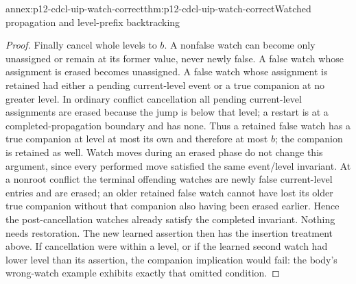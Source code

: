\begin{annexitem}{annex:p12-cdcl-uip-watch-correct}{thm:p12-cdcl-uip-watch-correct}{Watched propagation and level-prefix backtracking}
\begin{proof}
Finally cancel whole levels to \(b\).  A nonfalse watch can become only
unassigned or remain at its former value, never newly false.  A false watch
whose assignment is erased becomes unassigned.  A false watch whose assignment
is retained had either a pending current-level event or a true companion at
no greater level.  In ordinary conflict cancellation all pending current-level
assignments are erased because the jump is below that level; a restart is at
a completed-propagation boundary and has none.  Thus a retained false watch
has a true companion at level at most its own and therefore at most \(b\);
the companion is retained as well.  Watch moves during an erased phase do
not change this argument, since every performed move satisfied the same
event/level invariant.  At a nonroot conflict the terminal offending watches
are newly false current-level entries and are erased; an older retained false
watch cannot have lost its older true companion without that companion also
having been erased earlier.  Hence the post-cancellation watches already
satisfy the completed invariant.  Nothing needs restoration.  The new learned
assertion then has the insertion treatment above.  If cancellation were within
a level, or if the learned second watch had lower level than its assertion,
the companion implication would fail: the body's wrong-watch example exhibits
exactly that omitted condition.
\end{proof}
\end{annexitem}

